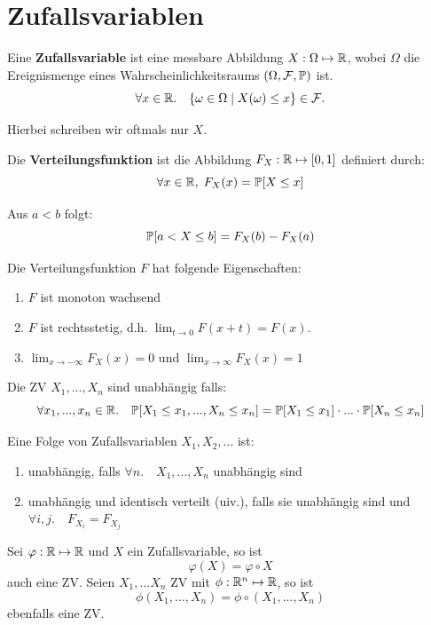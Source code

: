 \section{Zufallsvariablen}

Eine \textbf{Zufallsvariable} ist eine messbare Abbildung $X : \Omega \mapsto \mathbb{R}$, wobei $\Omega$ die Ereignismenge eines Wahrscheinlichkeitsraums $(\Omega, \mathcal{F}, \mathbb{P})$ ist.
$$\forall x \in \mathbb{R}. \quad \{\omega \in \Omega \; | \; X(\omega) \leq x\} \in \mathcal{F}.$$

Hierbei schreiben wir oftmals nur $X$.



Die \textbf{Verteilungsfunktion} ist die Abbildung $F_X:\mathbb{R} \mapsto [0,1]$ definiert durch:
$$\forall x \in \mathbb{R}, \; F_X(x) = \mathbb{P}[X \leq x]$$

\Satz Aus $a < b$ folgt:
$$\mathbb{P}[a < X \leq b] = F_X(b) - F_X(a)$$

Die Verteilungsfunktion $F$ hat folgende Eigenschaften:
\begin{enumerate}
    \item $F$ ist monoton wachsend
    \item $F$ ist rechtsstetig, d.h. $\lim_{t \to 0} F(x + t) = F(x)$.
    \item $\lim_{x \to - \infty}F_X(x) = 0$ und $\lim_{x \to \infty}F_X(x) = 1$
\end{enumerate}



Die ZV $X_1,...,X_n$ sind unabhängig falls:
$$\forall x_1,...,x_n \in \mathbb{R}. \quad \mathbb{P}[X_1 \leq x_1, ..., X_n \leq x_n] = \mathbb{P}[X_1 \leq x_1] \cdot ... \cdot \mathbb{P}[X_n \leq x_n]$$

Eine Folge von Zufallsvariablen $X_1, X_2, ...$ ist:
\begin{enumerate}
    \item unabhängig, falls $\forall n. \quad  X_1,...,X_n$ unabhängig sind
    \item unabhängig und identisch verteilt (uiv.), falls sie unabhängig sind und $\forall i,j. \quad F_{X_i} = F_{X_j}$
\end{enumerate}



Sei $\varphi: \mathbb{R} \mapsto \mathbb{R}$ und $X$ ein Zufallsvariable, so ist 
$$\varphi(X) = \varphi \circ X$$ 
auch eine ZV. Seien $X_1,...X_n$ ZV mit $\phi: \mathbb{R}^n \mapsto \mathbb{R}$, so ist 
$$\phi(X_1, ..., X_n) = \phi \circ (X_1,...,X_n)$$
ebenfalls eine ZV.


